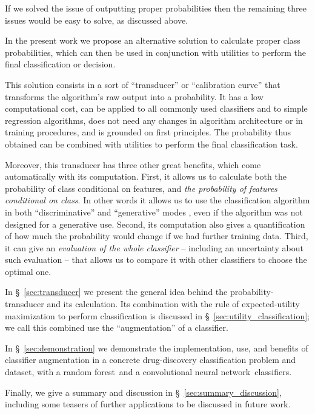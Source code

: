\documentclass[\ifafour a4paper,12pt,\else a5paper,10pt,\fi%
onecolumn,oneside,article,%
british%
]{memoir}
\theoremstyle{remark}
\theoremstyle{innote}
\renewcommand*{\|}[1][]{\nonscript\:#1\vert\nonscript\:\mathopen{}}
\newcommand*{\sect}{\S}%
\newcommand*{\RF}{random forest}
\newcommand*{\CNN}{convolutional neural network}
\begin{document}
If we solved the issue of outputting proper probabilities then the remaining three issues would be easy to solve, as discussed above.

\bigskip

In the present work we propose an alternative solution to calculate proper class probabilities, which can then be used in conjunction with utilities to perform the final classification or decision.

This solution consists in a sort of \enquote{transducer} or \enquote{calibration curve} that transforms the algorithm's raw output into a probability. It has a low computational cost, can be applied to all commonly used classifiers and to simple regression algorithms, does not need any changes in algorithm architecture or in training procedures, and is grounded on first principles. The probability thus obtained can be combined with utilities to perform the final classification task.

Moreover, this transducer has three other great benefits, which come automatically with its computation. First, it allows us to calculate both the probability of class conditional on features, and \emph{the probability of features conditional on class}. In other words it allows us to use the classification algorithm in both \enquote{discriminative} and \enquote{generative} modes \autocites[\sect~21.2.3]{russelletal1995_r2022}[\sect~8.6]{murphy2012}, even if the algorithm was not designed for a generative use. Second, its computation also gives a quantification of how much the probability would change if we had further training data. Third, it can give an \emph{evaluation of the whole classifier} -- including an uncertainty about such evaluation -- that allows us to compare it with other classifiers to choose the optimal one.

In \sect~\ref{sec:transducer} we present the general idea behind the probability-transducer and its calculation. Its combination with the rule of expected-utility maximization to perform classification is discussed in \sect~\ref{sec:utility_classification}; we call this combined use the \enquote{augmentation} of a classifier.

In \sect~\ref{sec:demonstration} we demonstrate the implementation, use, and benefits of classifier augmentation in a concrete drug-discovery classification problem and dataset, with a \RF\ and a \CNN\ classifiers.

Finally, we give a summary and discussion in \sect~\ref{sec:summary_discussion}, including some teasers of further applications to be discussed in future work.
\end{document}
